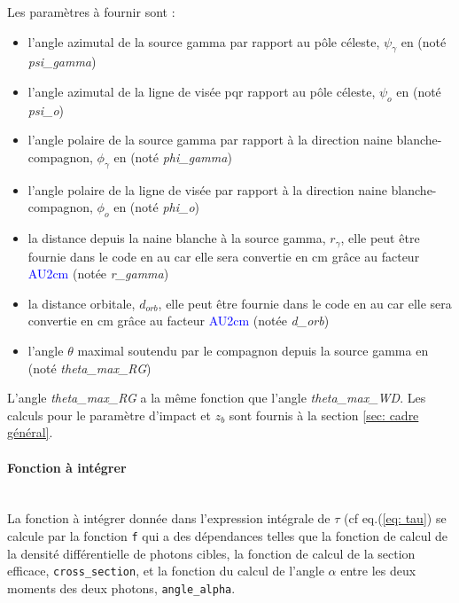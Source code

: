 \documentclass[a4paper,12pt,twoside]{article}
\begin{document}
\begin{appendices}
Les paramètres à fournir sont :
\begin{itemize}
	\item l'angle azimutal de la source gamma par rapport au pôle céleste, $\psi_\gamma$ en \si{\rad} (noté \textit{psi\_gamma})
    \item l'angle azimutal de la ligne de visée pqr rapport au pôle céleste, $\psi_o$ en \si{\rad} (noté \textit{psi\_o})
    \item l'angle polaire de la source gamma par rapport à la direction naine blanche-compagnon, $\phi_\gamma$ en \si{\rad} (noté \textit{phi\_gamma})
    \item l'angle polaire de la ligne de visée par rapport à la direction naine blanche-compagnon, $\phi_o$ en \si{\rad} (noté \textit{phi\_o})
    \item la distance depuis la naine blanche à la source gamma, $r_\gamma$, elle peut être fournie dans le code en \si{\astronomicalunit} car elle sera convertie en \si{\cm} grâce au facteur \textcolor{blue}{AU2cm} (notée \textit{r\_gamma})
    \item la distance orbitale, $d_{orb}$, elle peut être fournie dans le code en \si{\astronomicalunit} car elle sera convertie en \si{\cm} grâce au facteur \textcolor{blue}{AU2cm} (notée \textit{d\_orb})
    \item l'angle $\theta$ maximal soutendu par le compagnon depuis la source gamma en \si{\rad} (noté \textit{theta\_max\_RG})
\end{itemize}

L'angle \textit{theta\_max\_RG} a la même fonction que l'angle \textit{theta\_max\_WD}. Les calculs pour le paramètre d'impact et $z_b$ sont fournis à la section \ref{sec: cadre général}.

\paragraph*{Fonction à intégrer} \hspace{0pt} \\

La fonction à intégrer donnée dans l'expression intégrale de $\tau$ (cf eq.(\ref{eq: tau}) se calcule par la fonction \texttt{f} qui a des dépendances telles que la fonction de calcul de la densité différentielle de photons cibles, la fonction de calcul de la section efficace, \texttt{cross\_section}, et la fonction du calcul de l'angle $\alpha$ entre les deux moments des deux photons, \texttt{angle\_alpha}.


\end{appendices}
\end{document}
